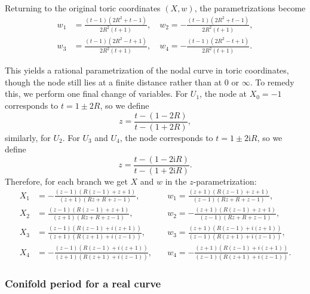 \documentclass[11pt, a4paper]{article}
\newcommand{\ii}{\mathrm{i}}
\numberwithin{equation}{section}
\begin{document}
Returning to the original toric coordinates $(X, w)$, the parametrizations become
\begin{equation}
  \begin{aligned}
  w_1 &= \frac{(t-1) \left(2 R^2+t-1\right)}{2 R^2 (t+1)}, \quad
  w_2 = -\frac{(t-1) \left(2 R^2+t-1\right)}{2 R^2 (t+1)}, \\
  w_3 &= \frac{(t-1) \left(2 R^2-t+1\right)}{2 R^2 (t+1)}, \quad
  w_4 = -\frac{(t-1) \left(2 R^2-t+1\right)}{2 R^2 (t+1)}.
  \end{aligned}
\end{equation}

This yields a rational parametrization of the nodal curve in toric coordinates, though the node still lies at a finite distance rather than at $0$ or $\infty$. To remedy this, we perform one final change of variables. For $U_1$, the node at $X_0 = -1$ corresponds to $t = 1 \pm 2R$, so we define
\begin{equation}
  z = \frac{t - (1-2R)}{t - (1+2R)},
\end{equation}
similarly, for $U_2$. For $U_3$ and $U_4$, the node corresponds to $t = 1 \pm 2 \ii R$, so we define
\begin{equation}
  z = \frac{t - (1-2\ii R)}{t - (1+2\ii R)}.
\end{equation}
Therefore, for each branch we get $X$ and $w$ in the $z$-parametrization:
\begin{equation}\label{eqn:F0rationalparam}
  \begin{aligned}
    X_1 &= -\frac{(z-1) (R (z-1)+z+1)}{(z+1) (R z+R+z-1)}, &\quad
    w_1 = \frac{(z+1) (R (z-1)+z+1)}{(z-1) (R z+R+z-1)}, \\
    X_2 &= \frac{(z-1) (R (z-1)+z+1)}{(z+1) (R z+R+z-1)}, &\quad
    w_2 = -\frac{(z+1) (R (z-1)+z+1)}{(z-1) (R z+R+z-1)}, \\
    X_3 &= \frac{(z-1) (R (z-1)+i (z+1))}{(z+1) (R (z+1)+i (z-1))}, &\quad
    w_3 = \frac{(z+1) (R (z-1)+i (z+1))}{(z-1) (R (z+1)+i (z-1))}, \\
    X_4 &= -\frac{(z-1) (R (z-1)+i (z+1))}{(z+1) (R (z+1)+i (z-1))}, &\quad
    w_4 = -\frac{(z+1) (R (z-1)+i (z+1))}{(z-1) (R (z+1)+i (z-1))}.
  \end{aligned}
\end{equation}

\subsubsection{Conifold period for a real curve}
\end{document}
